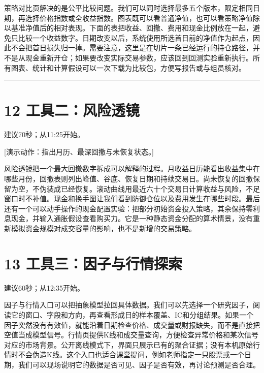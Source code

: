 \documentclass[UTF8,a4paper,12pt]{ctexart}
\begin{document}
策略对比页解决的是公平比较问题。我们可以同时选择最多五个版本，限定相同日期，再选择价格指数或全收益指数。图表既可以看普通净值，也可以看策略净值除以基准净值后的相对表现。下面的表把收益、回撤、费用和现金比例放在一起，避免只比较一个收益数字。日期改变以后，系统使用所选首日前的净值作为起点，因此不会把首日损失归一掉。需要注意，这里是在切片一条已经运行的持仓路径，并不是从现金重新开仓；如果要改变实际交易参数，应该回到回测实验重新执行。所有图表、统计和计算假设可以一次下载为比较包，方便写报告或与组员核对。


\vspace{6mm}\noindent\textcolor{accent!40}{\rule{\textwidth}{0.4pt}}\par

\section*{\color{ink}12  工具二：风险透镜}

{\small\color{accent}建议70秒；从11:25开始。}\par

{\small\color{accent}[演示动作：指出月历、最深回撤与未恢复状态。]}\par

风险透镜把一个最大回撤数字拆成可以解释的过程。月收益日历能看出收益集中在哪些月份，回撤表则列出峰值、谷底、恢复日期和持续交易日。尚未恢复的回撤保留为空，不伪装成已经恢复。滚动曲线用最近六十个交易日计算收益与风险，不足窗口时不补值。现金和换手图让我们看到防御仓位以及费用发生在哪些时段。最后还有一个可以动手操作的现金配置实验：把部分初始资金投入策略，其余保持零利息现金，并输入通胀假设查看购买力。它是一种静态资金分配的算术情景，没有重新模拟资金规模对成交容量的影响，也不是新增的交易策略。


\newpage
\section*{\color{ink}13  工具三：因子与行情探索}

{\small\color{accent}建议60秒；从12:35开始。}\par

因子与行情入口可以把抽象模型拉回具体数据。我们可以先选择一个研究因子，阅读它的窗口、字段和方向，再查看形成日的样本覆盖、IC和分组结果。如果一个因子突然没有有效值，就能沿着日期检查价格、成交量或财报缺失，而不是直接把空值当成模型信号。行情页提供K线和成交量查询，方便检查异常价格和某次信号对应的市场背景。公开离线模式下，界面只展示已有的聚合证据；没有本机原始行情时不会伪造K线。这个入口也适合课堂提问，例如老师指定一只股票或一个日期，我们可以现场说明它的数据是否可见、因子是否有效，再讨论预测是否合理。
\end{document}

